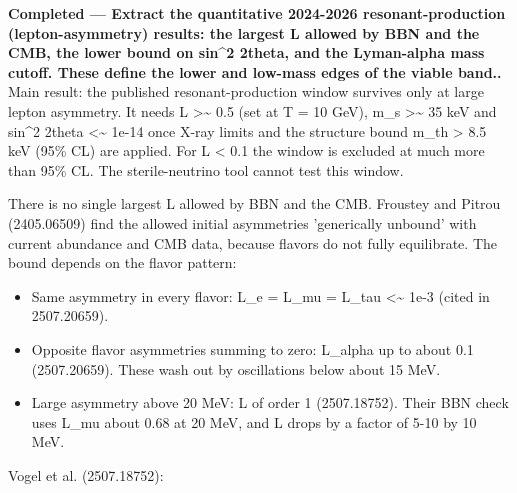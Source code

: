 \documentclass[11pt,a4paper]{article}
\begin{document}
\textbf{Completed --- Extract the quantitative 2024-2026 resonant-production (lepton-asymmetry) results: the largest L allowed by BBN and the CMB, the lower bound on sin\textasciicircum{}2 2theta, and the Lyman-alpha mass cutoff. These define the lower and low-mass edges of the viable band..} Main result: the published resonant-production window survives only at large lepton asymmetry. It needs L \textgreater{}\textasciitilde{} 0.5 (set at T = 10 GeV), m\_s \textgreater{}\textasciitilde{} 35 keV and sin\textasciicircum{}2 2theta \textless{}\textasciitilde{} 1e-14 once X-ray limits and the structure bound m\_th \textgreater{} 8.5 keV (95\% CL) are applied. For L \textless{} 0.1 the window is excluded at much more than 95\% CL. The sterile-neutrino tool cannot test this window.

There is no single largest L allowed by BBN and the CMB. Froustey and Pitrou (2405.06509) find the allowed initial asymmetries 'generically unbound' with current abundance and CMB data, because flavors do not fully equilibrate. The bound depends on the flavor pattern:

\begin{itemize}
  \item Same asymmetry in every flavor: L\_e = L\_mu = L\_tau \textless{}\textasciitilde{} 1e-3 (cited in 2507.20659).
  \item Opposite flavor asymmetries summing to zero: \textbar{}L\_alpha\textbar{} up to about 0.1 (2507.20659). These wash out by oscillations below about 15 MeV.
  \item Large asymmetry above 20 MeV: L of order 1 (2507.18752). Their BBN check uses L\_mu about 0.68 at 20 MeV, and L drops by a factor of 5-10 by 10 MeV.
\end{itemize}
Vogel et al. (2507.18752):
\end{document}
